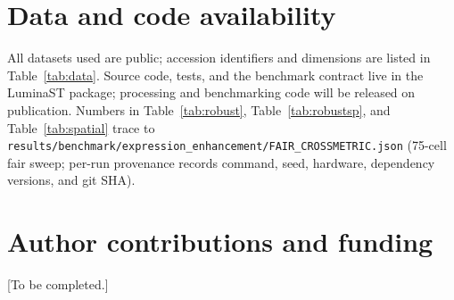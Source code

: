 \documentclass[10pt,letterpaper]{article}
\begin{document}
\section*{Data and code availability}

All datasets used are public; accession identifiers and dimensions are listed in
Table~\ref{tab:data}. Source code, tests, and the benchmark contract live in the LuminaST
package; processing and benchmarking code will be released on publication. Numbers in
Table~\ref{tab:robust}, Table~\ref{tab:robustsp}, and Table~\ref{tab:spatial} trace to
\texttt{results/benchmark/expression\_enhancement/FAIR\_CROSSMETRIC.json} (75-cell fair
sweep; per-run provenance records command, seed, hardware, dependency versions, and git SHA).

\section*{Author contributions and funding}

[To be completed.]



\end{document}
